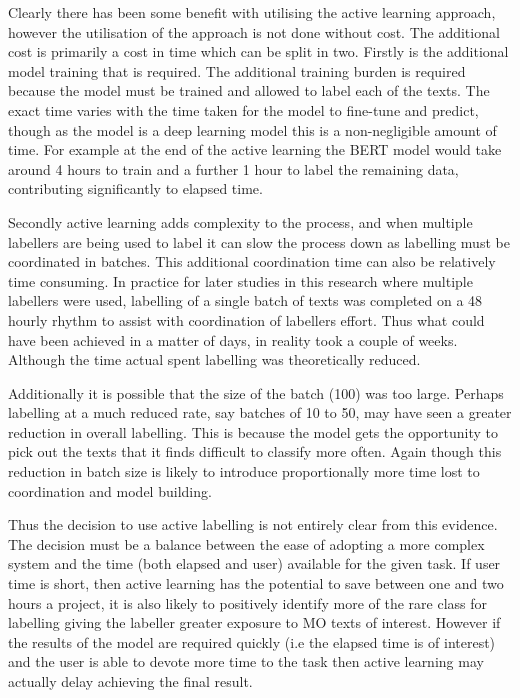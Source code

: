 Clearly there has been some benefit with utilising the active learning approach, however the utilisation of the approach is not done without cost. The additional cost is primarily a cost in time which can be split in two. Firstly is the additional model training that is required. The additional training burden is required because the model must be trained and allowed to label each of the texts. The exact time varies with the time taken for the model to fine-tune and predict, though as the model is a deep learning model this is a  non-negligible amount of time. For example at the end of the active learning the BERT model would take around 4 hours to train and a further 1 hour to label the remaining data, contributing significantly to elapsed time. 

Secondly active learning adds complexity to the process, and when multiple labellers are being used to label it can slow the process down as labelling must be coordinated in batches. This additional coordination time can also be relatively time consuming. In practice for later studies in this research where multiple labellers were used, labelling of a single batch of  texts was completed on a 48 hourly rhythm to assist with coordination of labellers effort. Thus what could have been achieved in a matter of days, in reality took a couple of weeks. Although the time actual spent labelling was theoretically reduced. 

Additionally it is possible that the size of the batch (100) was too large. Perhaps labelling at a much reduced rate, say batches of 10 to 50, may have seen a greater reduction in overall labelling. This is because the model gets the opportunity to pick out the texts that it finds difficult to classify more often. Again though this reduction in batch size is likely to introduce proportionally more time lost to coordination and model building.

Thus the decision to use active labelling is not entirely clear from this evidence. The decision must be a balance between the ease of adopting a more complex system and the time (both elapsed and user) available for the given task. If user time is short, then active learning has the potential to save between one and two hours a project, it is also likely to positively identify more of the rare class for labelling giving the labeller greater exposure to MO texts of interest. However if the results of the model are required quickly (i.e the elapsed time is of interest) and the user is able to devote more time to the task then active learning may actually delay achieving the final result.


